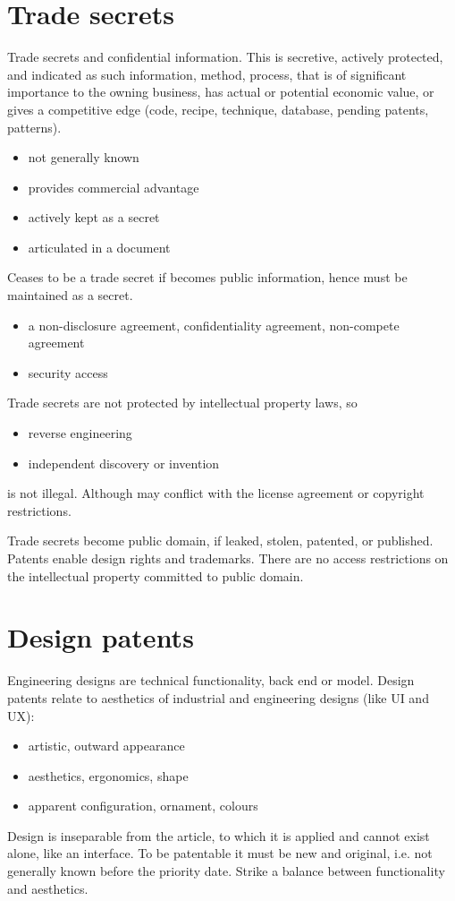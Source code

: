 \documentclass[10pt,a4paper,twocolumn]{article}
\begin{document}

\section{Trade secrets} %
\label{sec:trade_secrets}

Trade secrets and confidential information. This is secretive, actively protected, and
indicated as such information, method, process, that is of significant importance to
the owning business, has actual or potential economic value, or gives a competitive edge
(code, recipe, technique, database, pending patents, patterns).
\begin{itemize}
  \item not generally known
  \item provides commercial advantage
  \item actively kept as a secret
  \item articulated in a document
\end{itemize}
Ceases to be a trade secret if becomes public information, hence must be maintained
as a secret.
\begin{itemize}
  \item a non-disclosure agreement, confidentiality agreement, non-compete agreement
  \item security access
\end{itemize}
Trade secrets are not protected by intellectual property laws, so
\begin{itemize}
  \item reverse engineering
  \item independent discovery or invention
\end{itemize}
is not illegal. Although may conflict with the license agreement or copyright restrictions.

Trade secrets become public domain, if leaked, stolen, patented, or published. Patents
enable design rights and trademarks. There are no access restrictions on the intellectual
property committed to public domain.


\section{Design patents} %
\label{sec:design_patents}

Engineering designs are technical functionality, back end or model. Design patents relate
to aesthetics of industrial and engineering designs (like UI and UX):
\begin{itemize}
  \item artistic, outward appearance
  \item aesthetics, ergonomics, shape
  \item apparent configuration, ornament, colours
\end{itemize}
Design is inseparable from the article, to which it is applied and cannot exist alone,
like an interface. To be patentable it must be new and original, i.e. not generally
known before the priority date. Strike a balance between functionality and aesthetics.
\end{document}
